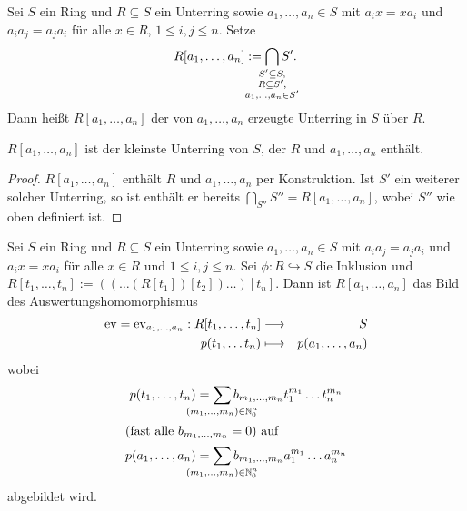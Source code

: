 \documentclass[12pt,a4paper]{scrartcl}
\begin{document}
\begin{defi}
	Sei $S$ ein Ring und $R\subseteq S$ ein Unterring sowie $a_1,\dots,a_n\in S$ mit $a_ix = xa_i$ und $a_ia_j = a_ja_i$ für alle $x\in R$, $1\leq i,j\leq n$. Setze
	\[ R[a_1,\dots,a_n] := \bigcap_{\mathclap{\substack{S'\subseteq S,\\R\subseteq S',\\ a_1,\dots,a_n\in S'}}}S'.\]
	Dann heißt $R[a_1,\dots,a_n]$ der von $a_1,\dots,a_n$ erzeugte Unterring in $S$ über $R$. 
\end{defi}


\begin{bem}
	$R[a_1,\dots,a_n]$ ist der kleinste Unterring von $S$, der $R$ und $a_1,\dots,a_n$ enthält.
\end{bem}
\begin{proof}
	$R[a_1,\dots,a_n]$ enthält $R$ und $a_1,\dots,a_n$ per Konstruktion.
	Ist $S'$ ein weiterer solcher Unterring, so ist enthält er bereits $\bigcap_{S''}S'' = R[a_1,\dots,a_n]$, wobei $S''$ wie oben definiert ist.
\end{proof}

\begin{satz}\label{thm:evalpolyring}
	Sei $S$ ein Ring und $R\subseteq S$ ein Unterring sowie $a_1,\dots,a_n\in S$ mit $a_ia_j = a_ja_i$ und $a_ix = xa_i$ für alle $x\in R$ und $1\leq i,j\leq n$. Sei $\phi \colon R\hookrightarrow S$ die Inklusion und $R[t_1,\dots, t_n] := ((\dots(R[t_1])[t_2])\dots)[t_n]$. Dann ist $R[a_1,\dots,a_n]$ das Bild des Auswertungshomomorphismus 
	\begin{eqnarray*}
		\operatorname{ev} = \operatorname{ev}_{a_1,\dots,a_n}: R[t_1,\dots,t_n] & \longrightarrow & S\\
		p(t_1,\dots t_n) & \longmapsto & p(a_1, \dots, a_n)
	\end{eqnarray*}
	wobei
	\begin{align*}
		p (t_1,\dots, t_n) &= \sum_{\mathclap{(m_1,\dots,m_n)\in\IN_{0}^n}}b_{m_1,\dots,m_n} t_1^{m_1} \dots t_n^{m_n} \\
		\intertext{(fast alle $b_{m_1,\dots,m_n} = 0$) auf}
		p(a_1,\dots, a_n ) &= \sum_{\mathclap{(m_1,\dots, m_n)\in \IN_0^n}} b_{m_1,\dots,m_n} a_1^{m_1}\dots a_n^{m_n}
	\end{align*}
	abgebildet wird.
\end{satz}
\end{document}
